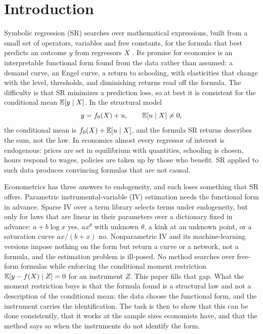 \section{Introduction}

Symbolic regression (SR) searches over mathematical expressions, built from a small set of operators, variables and free constants, for the formula that best predicts an outcome $y$ from regressors $X$ \citep{schmidt2009,udrescu2020,cranmer2023}. Its promise for economics is an interpretable functional form found from the data rather than assumed: a demand curve, an Engel curve, a return to schooling, with elasticities that change with the level, thresholds, and diminishing returns read off the formula. The difficulty is that SR minimizes a prediction loss, so at best it is consistent for the conditional mean $\mathbb{E}[y \mid X]$. In the structural model
\[
y = f_0(X) + u, \qquad \mathbb{E}[u \mid X] \neq 0,
\]
the conditional mean is $f_0(X) + \mathbb{E}[u \mid X]$, and the formula SR returns describes the sum, not the law. In economics almost every regressor of interest is endogenous: prices are set in equilibrium with quantities, schooling is chosen, hours respond to wages, policies are taken up by those who benefit. SR applied to such data \citep{balla2025,rossetti2026} produces convincing formulas that are not causal.

Econometrics has three answers to endogeneity, and each loses something that SR offers. Parametric instrumental-variable (IV) estimation \citep{hansen1982} needs the functional form in advance. Sparse IV over a term library \citep{gautierrose,fanliao2014,linfengli2015,caner2009} selects terms under endogeneity, but only for laws that are linear in their parameters over a dictionary fixed in advance: $a + b\log x$ yes, $a x^{\theta}$ with unknown $\theta$, a kink at an unknown point, or a saturation curve $ax/(b + x)$ no. Nonparametric IV \citep{neweypowell2003,hallhorowitz2005,bck2007,chenpouzo2012} and its machine-learning versions \citep{hartford2017,singh2019,bennett2019,dikkala2020,xu2021} impose nothing on the form but return a curve or a network, not a formula, and the estimation problem is ill-posed. No method searches over free-form formulas while enforcing the conditional moment restriction $\mathbb{E}[y - f(X) \mid Z] = 0$ for an instrument $Z$. This paper fills that gap. What the moment restriction buys is that the formula found is a structural law and not a description of the conditional mean: the data choose the functional form, and the instrument carries the identification. The task is then to show that this can be done consistently, that it works at the sample sizes economists have, and that the method says so when the instruments do not identify the form.

